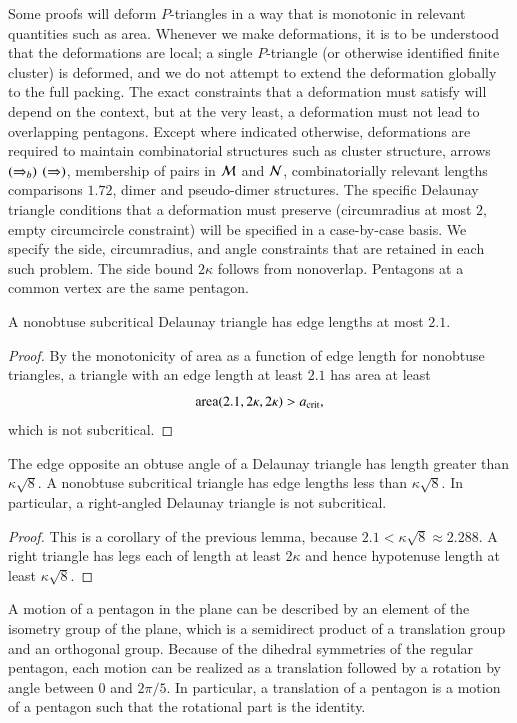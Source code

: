 Some proofs will deform $P$-triangles in a way that is monotonic in
relevant quantities such as area. Whenever we make deformations, it
is to be understood that the deformations are local; a single
$P$-triangle (or otherwise identified finite cluster) is deformed, and
we do not attempt to extend the deformation globally to the full
packing. The exact constraints that a deformation must satisfy will
depend on the context, but at the very least, a deformation must not
lead to overlapping pentagons. Except where indicated otherwise,
deformations are required to maintain combinatorial structures such
as cluster structure, arrows $(\Rightarrow_{b})$ $(\Rightarrow)$, membership of pairs in
$\mathcal M$ and $\mathcal N$, combinatorially relevant lengths comparisons $1.72$,
dimer and pseudo-dimer structures.  The specific Delaunay triangle
conditions that a deformation must preserve (circumradius at most $2$,
empty circumcircle constraint) will be specified in a case-by-case
basis.  We specify the side, circumradius, and angle constraints that
are retained in each such problem.  The side bound $2\kappa$ follows
from nonoverlap.  Pentagons at a common vertex are the same pentagon.

\begin{lemma} 
  A nonobtuse subcritical Delaunay triangle has edge lengths at most $2.1$.
\end{lemma}

\begin{proof} By the monotonicity of area as a function of edge length
  for nonobtuse triangles, a triangle with an edge length at least
  $2.1$ has area at least
\[
{\operatorname{area}}(2.1,2\kappa,2\kappa) > a_\text{crit},
\] %
which is not subcritical.
\end{proof}

\begin{lemma}
  The edge opposite an obtuse angle of a Delaunay triangle has length greater than $\kappa\sqrt8$.
  A nonobtuse subcritical triangle has edge lengths less than
  $\kappa\sqrt8$.  In particular, a right-angled Delaunay triangle is
  not subcritical.
\end{lemma}

\begin{proof}  
  This is a corollary of the previous lemma, because $2.1 <
  \kappa\sqrt8 \approx 2.288$.
  A right triangle has legs each of length at least $2\kappa$ and hence
  hypotenuse length at least $\kappa\sqrt8$.
\end{proof}

\begin{remark}
  A motion of a pentagon in the plane can be described by an element
  of the isometry group of the plane, which is a semidirect product of
  a translation group and an orthogonal group.  Because of the
  dihedral symmetries of the regular pentagon, each motion can be
  realized as a translation followed by a rotation by angle between
  $0$ and $2\pi/5$.  In particular, a translation of a pentagon is a
  motion of a pentagon such that the rotational part is the identity.
\end{remark}

